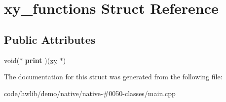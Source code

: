 \hypertarget{structxy__functions}{}\section{xy\+\_\+functions Struct Reference}
\label{structxy__functions}
\subsection*{Public Attributes}
\begin{DoxyCompactItemize}
\item 
\mbox{\label{structxy__functions_a7d31090f6d5d4f48acbbafed7e17a967}} 
void($\ast$ {\bfseries print} )(\hyperlink{structxy}{xy} $\ast$)
\end{DoxyCompactItemize}


The documentation for this struct was generated from the following file\+:\begin{DoxyCompactItemize}
\item 
code/hwlib/demo/native/native-\/\#0050-\/classes/main.\+cpp\end{DoxyCompactItemize}
